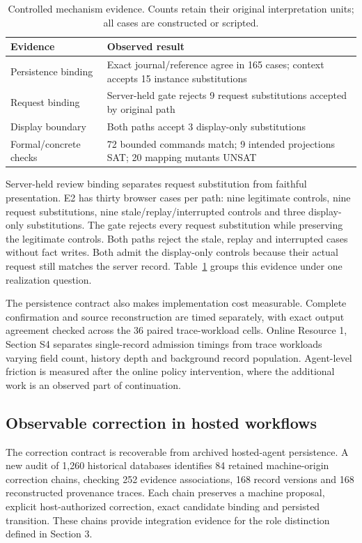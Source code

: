 \documentclass[10pt,a4paper,twocolumn]{article}
\begin{document}
\begin{table}[t]
\centering\small
\caption{Controlled mechanism evidence. Counts retain their original interpretation units; all cases are constructed or scripted.}
\label{tab:controlled}
\begin{tabularx}{\columnwidth}{@{}lX@{}}
\toprule
Evidence & Observed result \\
\midrule
Persistence binding & Exact journal/reference agree in 165 cases; context accepts 15 instance substitutions \\
Request binding & Server-held gate rejects 9 request substitutions accepted by original path \\
Display boundary & Both paths accept 3 display-only substitutions \\
Formal/concrete checks & 72 bounded commands match; 9 intended projections SAT; 20 mapping mutants UNSAT \\
\bottomrule
\end{tabularx}
\end{table}

Server-held review binding separates request substitution from faithful presentation. E2 has thirty browser cases per path: nine legitimate controls, nine request substitutions, nine stale/replay/interrupted controls and three display-only substitutions. The gate rejects every request substitution while preserving the legitimate controls. Both paths reject the stale, replay and interrupted cases without fact writes. Both admit the display-only controls because their actual request still matches the server record. Table~\ref{tab:controlled} groups this evidence under one realization question.

The persistence contract also makes implementation cost measurable. Complete confirmation and source reconstruction are timed separately, with exact output agreement checked across the 36 paired trace-workload cells. Online Resource 1, Section S4 separates single-record admission timings from trace workloads varying field count, history depth and background record population. Agent-level friction is measured after the online policy intervention, where the additional work is an observed part of continuation.

\subsection{Observable correction in hosted workflows}
The correction contract is recoverable from archived hosted-agent persistence. A new audit of 1,260 historical databases identifies 84 retained machine-origin correction chains, checking 252 evidence associations, 168 record versions and 168 reconstructed provenance traces. Each chain preserves a machine proposal, explicit host-authorized correction, exact candidate binding and persisted transition. These chains provide integration evidence for the role distinction defined in Section 3.
\end{document}
